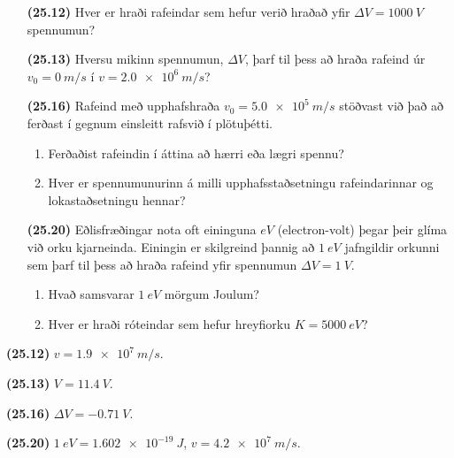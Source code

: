 \begin{enumerate}[label = \textbf{(\alph*)}]

\item[\textbf{(25.12)}] Hver er hraði rafeindar sem hefur verið hraðað yfir $\Delta V = \SI{1000}{V}$ spennumun?

\item[\textbf{(25.13)}] Hversu mikinn spennumun, $\Delta V$, þarf til þess að hraða rafeind úr $v_0 = \SI{0}{m/s}$ í $v = \SI{2.0e6}{m/s}$?

\item[\textbf{(25.16)}] Rafeind með upphafshraða $v_0 = \SI{5.0e5}{m/s}$ stöðvast við það að ferðast í gegnum einsleitt rafsvið í plötuþétti.
\begin{enumerate}[label = \textbf{(\alph*})]
    \item Ferðaðist rafeindin í áttina að hærri eða lægri spennu?
    \item Hver er spennumunurinn á milli upphafsstaðsetningu rafeindarinnar og lokastaðsetningu hennar?
\end{enumerate}

\item[\textbf{(25.20)}] Eðlisfræðingar nota oft eininguna $\si{eV}$ (electron-volt) þegar þeir glíma við orku kjarneinda. Einingin er skilgreind þannig að $\SI{1}{eV}$ jafngildir orkunni sem þarf til þess að hraða rafeind yfir spennumun $\Delta V = \SI{1}{V}$.
\begin{enumerate}[label = \textbf{(\alph*)}]
    \item Hvað samsvarar $\SI{1}{eV}$ mörgum Joulum?
    \item Hver er hraði róteindar sem hefur hreyfiorku $K = \SI{5000}{eV}$?
\end{enumerate}

\end{enumerate}

\begin{tcolorbox}
\begin{enumerate*}[label = \vspace{0.15cm} ]
  \item \textbf{(25.12)} $v = \SI{1.9e7}{m/s}$.
  \item \textbf{(25.13)} $V = \SI{11.4}{V}$.
  \item \textbf{(25.16)} $\Delta V = \SI{-0.71}{V}$.
  \item \textbf{(25.20)} $\SI{1}{eV} = \SI{1.602e-19}{J}$, $v = \SI{4.2e7}{m/s}$.
\end{enumerate*}
\end{tcolorbox}

